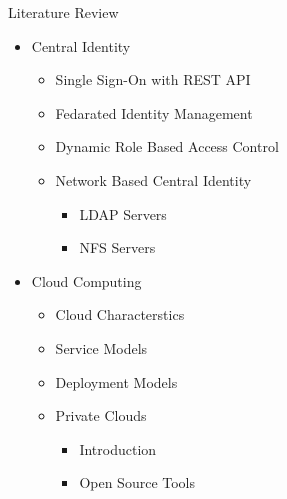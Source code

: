 \documentclass[10pt,xcolor=dvipsnames]{beamer}
\begin{document}
\begin{frame}[allowframebreaks]{Literature Review }
\begin{itemize}
		\item Central Identity
		\begin{itemize}
			\item Single Sign-On with REST API
			\item Fedarated Identity Management
			\item Dynamic Role Based Access Control
			\item Network Based Central Identity
			\begin{itemize}
				\item LDAP Servers
				\item NFS Servers
			\end{itemize}
		\end{itemize}
		
		\framebreak
		\item Cloud Computing
		\begin{itemize}
			\item Cloud Characterstics
			\item Service Models 
			\item Deployment Models 
			\item Private Clouds 
			\begin{itemize}
			 	\item Introduction 
				\item Open Source Tools 
			\end{itemize}	
		\end{itemize}		 
				

	\end{itemize}
\end{frame}
\end{document}
